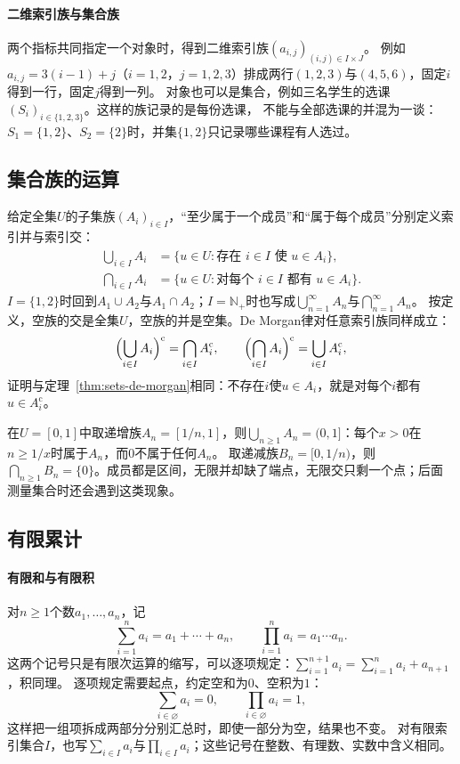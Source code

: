 \paragraph{二维索引族与集合族}
两个指标共同指定一个对象时，得到二维索引族$(a_{i,j})_{(i,j)\in I\times J}$。
例如$a_{i,j}=3(i-1)+j$（$i=1,2$，$j=1,2,3$）排成两行$(1,2,3)$与$(4,5,6)$，固定$i$得到一行，固定$j$得到一列。
对象也可以是集合，例如三名学生的选课$(S_i)_{i\in\{1,2,3\}}$。这样的族记录的是每份选课，
不能与全部选课的并混为一谈：$S_1=\{1,2\}$、$S_2=\{2\}$时，并集$\{1,2\}$只记录哪些课程有人选过。

\subsection{集合族的运算}
\label{sec:prelim-indexed-set-operations}

给定全集$U$的子集族$(A_i)_{i\in I}$，“至少属于一个成员”和“属于每个成员”分别定义索引并与索引交：
\[
 \begin{aligned}
  \bigcup_{i\in I}A_i&=\{u\in U:\text{存在 }i\in I\text{ 使 }u\in A_i\},\\
  \bigcap_{i\in I}A_i&=\{u\in U:\text{对每个 }i\in I\text{ 都有 }u\in A_i\}.
 \end{aligned}
\]
$I=\{1,2\}$时回到$A_1\cup A_2$与$A_1\cap A_2$；$I=\mathbb N_+$时也写成$\bigcup_{n=1}^\infty A_n$与$\bigcap_{n=1}^\infty A_n$。
按定义，空族的交是全集$U$，空族的并是空集。De Morgan律对任意索引族同样成立：
\begin{equation}
 \Bigl(\bigcup_{i\in I}A_i\Bigr)^{\mathrm c}=\bigcap_{i\in I}A_i^{\mathrm c},\qquad
 \Bigl(\bigcap_{i\in I}A_i\Bigr)^{\mathrm c}=\bigcup_{i\in I}A_i^{\mathrm c},
 \label{eq:prelim-de-morgan-families}
\end{equation}
证明与定理~\ref{thm:sets-de-morgan}相同：不存在$i$使$u\in A_i$，就是对每个$i$都有$u\in A_i^{\mathrm c}$。

在$U=[0,1]$中取递增族$A_n=[1/n,1]$，则$\bigcup_{n\geq1}A_n=(0,1]$：每个$x>0$在$n\geq1/x$时属于$A_n$，而$0$不属于任何$A_n$。
取递减族$B_n=[0,1/n)$，则$\bigcap_{n\geq1}B_n=\{0\}$。成员都是区间，无限并却缺了端点，无限交只剩一个点；后面测量集合时还会遇到这类现象。

\subsection{有限累计}
\label{sec:prelim-finite-sums-products}

\paragraph{有限和与有限积}
对$n\geq1$个数$a_1,\ldots,a_n$，记
\[
 \sum_{i=1}^{n}a_i=a_1+\cdots+a_n,\qquad \prod_{i=1}^{n}a_i=a_1\cdots a_n.
\]
这两个记号只是有限次运算的缩写，可以逐项规定：$\sum_{i=1}^{n+1}a_i=\sum_{i=1}^na_i+a_{n+1}$，积同理。
逐项规定需要起点，约定空和为$0$、空积为$1$：
\[
 \sum_{i\in\varnothing}a_i=0,\qquad \prod_{i\in\varnothing}a_i=1,
\]
这样把一组项拆成两部分分别汇总时，即使一部分为空，结果也不变。
对有限索引集合$I$，也写$\sum_{i\in I}a_i$与$\prod_{i\in I}a_i$；这些记号在整数、有理数、实数中含义相同。

